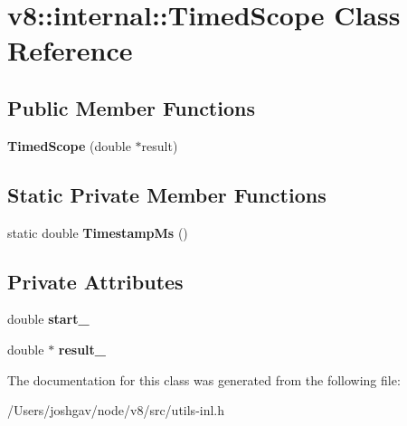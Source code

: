 \hypertarget{classv8_1_1internal_1_1_timed_scope}{}\section{v8\+:\+:internal\+:\+:Timed\+Scope Class Reference}
\label{classv8_1_1internal_1_1_timed_scope}
\subsection*{Public Member Functions}
\begin{DoxyCompactItemize}
\item 
{\bfseries Timed\+Scope} (double $\ast$result)\hypertarget{classv8_1_1internal_1_1_timed_scope_a2eed8e19aaf1110e060242628533ece3}{}\label{classv8_1_1internal_1_1_timed_scope_a2eed8e19aaf1110e060242628533ece3}

\end{DoxyCompactItemize}
\subsection*{Static Private Member Functions}
\begin{DoxyCompactItemize}
\item 
static double {\bfseries Timestamp\+Ms} ()\hypertarget{classv8_1_1internal_1_1_timed_scope_a0d80851b551133d6f391fd125ba68c29}{}\label{classv8_1_1internal_1_1_timed_scope_a0d80851b551133d6f391fd125ba68c29}

\end{DoxyCompactItemize}
\subsection*{Private Attributes}
\begin{DoxyCompactItemize}
\item 
double {\bfseries start\+\_\+}\hypertarget{classv8_1_1internal_1_1_timed_scope_a1d5478d5707314f4b2b9092885b8dcf2}{}\label{classv8_1_1internal_1_1_timed_scope_a1d5478d5707314f4b2b9092885b8dcf2}

\item 
double $\ast$ {\bfseries result\+\_\+}\hypertarget{classv8_1_1internal_1_1_timed_scope_a50755f5f4a2ade47d7d144de3cf31fcd}{}\label{classv8_1_1internal_1_1_timed_scope_a50755f5f4a2ade47d7d144de3cf31fcd}

\end{DoxyCompactItemize}


The documentation for this class was generated from the following file\+:\begin{DoxyCompactItemize}
\item 
/\+Users/joshgav/node/v8/src/utils-\/inl.\+h\end{DoxyCompactItemize}

